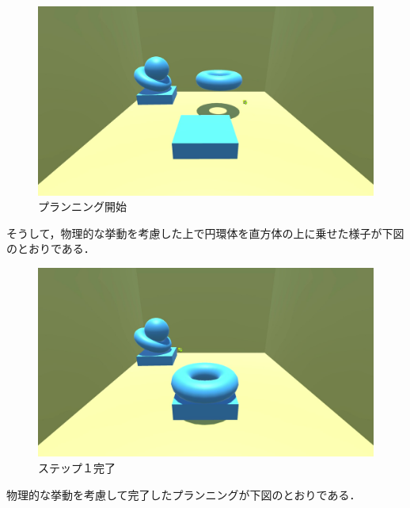 \documentclass[12pt]{jarticle}
\begin{document}
\begin{figure}[!hbt]
  	\begin{center}
  		\includegraphics[scale=0.2]{images/bwp5.jpg}
	\end{center}
  	\caption{プランニング開始}
\end{figure}
\clearpage

そうして，物理的な挙動を考慮した上で円環体を直方体の上に乗せた様子が下図のとおりである．

\begin{figure}[!hbt]
  	\begin{center}
  		\includegraphics[scale=0.2]{images/bwp6.jpg}
	\end{center}
  	\caption{ステップ１完了}
\end{figure}
\clearpage

物理的な挙動を考慮して完了したプランニングが下図のとおりである．
\end{document}
